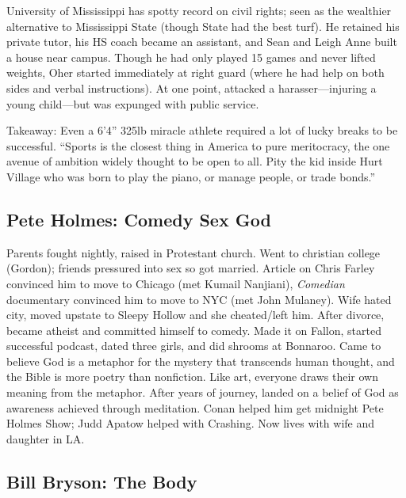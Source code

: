 \documentclass[
]{article}
\begin{document}
University of Mississippi has spotty record on civil rights; seen as the
wealthier alternative to Mississippi State (though State had the best
turf). He retained his private tutor, his HS coach became an assistant,
and Sean and Leigh Anne built a house near campus. Though he had only
played 15 games and never lifted weights, Oher started immediately at
right guard (where he had help on both sides and verbal instructions).
At one point, attacked a harasser---injuring a young child---but was
expunged with public service.

Takeaway: Even a 6'4'' 325lb miracle athlete required a lot of lucky
breaks to be successful. ``Sports is the closest thing in America to
pure meritocracy, the one avenue of ambition widely thought to be open
to all. Pity the kid inside Hurt Village who was born to play the piano,
or manage people, or trade bonds.''

\hypertarget{pete-holmes-comedy-sex-god}{%
\subsection{Pete Holmes: Comedy Sex
God}\label{pete-holmes-comedy-sex-god}}

Parents fought nightly, raised in Protestant church. Went to christian
college (Gordon); friends pressured into sex so got married. Article on
Chris Farley convinced him to move to Chicago (met Kumail Nanjiani),
\emph{Comedian} documentary convinced him to move to NYC (met John
Mulaney). Wife hated city, moved upstate to Sleepy Hollow and she
cheated/left him. After divorce, became atheist and committed himself to
comedy. Made it on Fallon, started successful podcast, dated three
girls, and did shrooms at Bonnaroo. Came to believe God is a metaphor
for the mystery that transcends human thought, and the Bible is more
poetry than nonfiction. Like art, everyone draws their own meaning from
the metaphor. After years of journey, landed on a belief of God as
awareness achieved through meditation. Conan helped him get midnight
Pete Holmes Show; Judd Apatow helped with Crashing. Now lives with wife
and daughter in LA.

\hypertarget{bill-bryson-the-body}{%
\subsection{Bill Bryson: The Body}\label{bill-bryson-the-body}}
\end{document}
